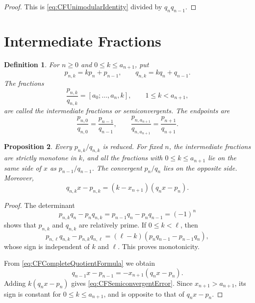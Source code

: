 \documentclass{book}
\newtheorem{definition}{Definition}[section]
\newtheorem{proposition}[definition]{Proposition}
\begin{document}
\begin{proof}
  This is \eqref{eq:CFUnimodularIdentity} divided by
  \(q_nq_{n-1}\).
\end{proof}

\section{Intermediate Fractions}

\begin{definition}
  For \(n\geq0\) and \(0\leq k\leq a_{n+1}\), put
  \[
    p_{n,k}=kp_n+p_{n-1},
    \qquad
    q_{n,k}=kq_n+q_{n-1}.
  \]
  The fractions
  \[
    \frac{p_{n,k}}{q_{n,k}}
    =[a_0;\ldots,a_n,k],
    \qquad 1\leq k<a_{n+1},
  \]
  are called the \textnormal{intermediate fractions} or
  \textnormal{semiconvergents}. The endpoints are
  \[
    \frac{p_{n,0}}{q_{n,0}}=\frac{p_{n-1}}{q_{n-1}},
    \qquad
    \frac{p_{n,a_{n+1}}}{q_{n,a_{n+1}}}
    =\frac{p_{n+1}}{q_{n+1}}.
  \]
\end{definition}

\begin{proposition}\label{prop:CFSemiconvergents}
  Every \(p_{n,k}/q_{n,k}\) is reduced. For fixed \(n\), the intermediate
  fractions are strictly monotone in \(k\), and all the fractions with
  \(0\leq k\leq a_{n+1}\) lie on the same side of \(x\) as
  \(p_{n-1}/q_{n-1}\). The convergent \(p_n/q_n\) lies on the opposite
  side. Moreover,
  \begin{equation}\label{eq:CFSemiconvergentError}
    q_{n,k}x-p_{n,k}
    =(k-x_{n+1})(q_nx-p_n).
  \end{equation}
\end{proposition}

\begin{proof}
  The determinant
  \[
    p_{n,k}q_n-p_nq_{n,k}
    =p_{n-1}q_n-p_nq_{n-1}
    =(-1)^n
  \]
  shows that \(p_{n,k}\) and \(q_{n,k}\) are relatively prime. If
  \(0\leq k<\ell\), then
  \[
    p_{n,\ell}q_{n,k}-p_{n,k}q_{n,\ell}
    =(\ell-k)(p_nq_{n-1}-p_{n-1}q_n),
  \]
  whose sign is independent of \(k\) and \(\ell\). This proves
  monotonicity.

  From \eqref{eq:CFCompleteQuotientFormula} we obtain
  \[
    q_{n-1}x-p_{n-1}
    =-x_{n+1}(q_nx-p_n).
  \]
  Adding \(k(q_nx-p_n)\) gives
  \eqref{eq:CFSemiconvergentError}. Since
  \(x_{n+1}>a_{n+1}\), its sign is constant for
  \(0\leq k\leq a_{n+1}\), and is opposite to that of
  \(q_nx-p_n\).
\end{proof}
\end{document}
